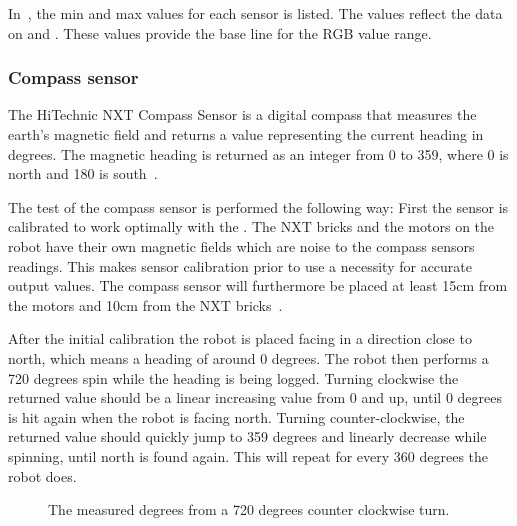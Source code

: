 In~, the min and max values for each sensor is listed. The values reflect the data on  and . These values provide the base line for the RGB value range.


\subsubsection{Compass sensor}
The HiTechnic NXT Compass Sensor is a digital compass that measures the earth's magnetic field and returns a value representing the current heading in degrees. The magnetic heading is returned as an integer from 0 to 359, where 0 is north and 180 is south~\citep{compass}.

The test of the compass sensor is performed the following way: First the sensor is calibrated to work optimally with the \projname{}. The NXT bricks and the motors on the robot have their own magnetic fields which are noise to the compass sensors readings. This makes sensor calibration prior to use a necessity for accurate output values. The compass sensor will furthermore be placed at least 15cm from the motors and 10cm from the NXT bricks~\citep{compass}.

After the initial calibration the robot is placed facing in a direction close to north, which means a heading of around 0 degrees. The robot then performs a 720 degrees spin while the heading is being logged. Turning clockwise the returned value should be a linear increasing value from 0 and up, until 0 degrees is hit again when the robot is facing north. Turning counter-clockwise, the returned value should quickly jump to 359 degrees and linearly decrease while spinning, until north is found again. This will repeat for every 360 degrees the robot does.

\begin{figure}[H]
     \caption{\label{fig:compass_sensor_test_graph} The measured degrees from a 720 degrees counter clockwise turn.}
\end{figure}

